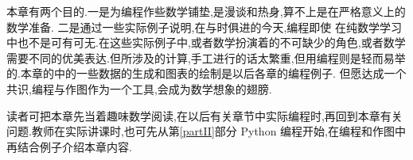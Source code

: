 \documentclass[main.tex]{subfiles}
\begin{document}
本章有两个目的.一是为编程作些数学铺垫,是漫谈和热身,算不上是在严格意义上的数学准备.
二是通过一些实际例子说明,在与时俱进的今天,编程即使
在纯数学学习中也不是可有可无.在这些实际例子中,或者数学扮演着的不可缺少的角色,或者数学需要不同的优美表达.但所涉及的计算,手工进行的话太繁重,但用编程则是轻而易举的.本章的中的一些数据的生成和图表的绘制是以后各章的编程例子.
但愿达成一个共识,编程与作图作为一个工具,会成为数学想象的翅膀.

读者可把本章先当着趣味数学阅读,在以后有关章节中实际编程时,再回到本章有关问题.教师在实际讲课时,也可先从第\ref{partII}部分 Python 编程开始,在编程和作图中再结合例子介绍本章内容.
\end{document}
